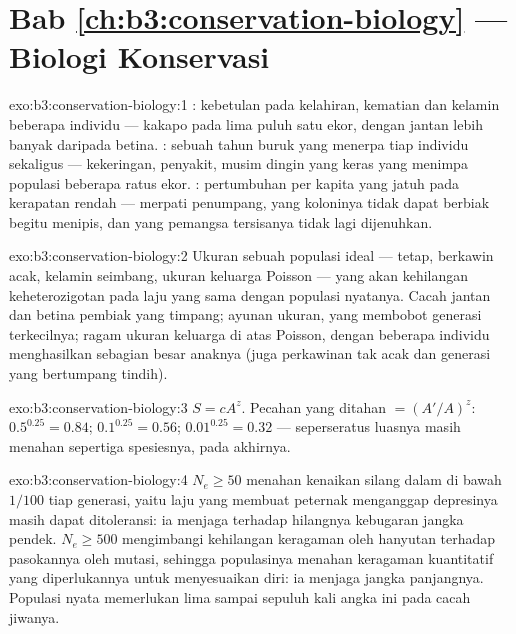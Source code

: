 \section*{Bab \ref{ch:b3:conservation-biology} --- Biologi Konservasi}

\begin{solution}{exo:b3:conservation-biology:1}
: kebetulan pada kelahiran, kematian dan kelamin
beberapa individu --- kakapo pada lima puluh satu ekor, dengan jantan
lebih banyak daripada betina. : sebuah tahun buruk
yang menerpa tiap individu sekaligus --- kekeringan, penyakit, musim
dingin yang keras yang menimpa populasi beberapa ratus ekor. :
pertumbuhan per kapita yang jatuh pada kerapatan rendah --- merpati
penumpang, yang koloninya tidak dapat berbiak begitu menipis, dan yang
pemangsa tersisanya tidak lagi dijenuhkan.
\end{solution}

\begin{solution}{exo:b3:conservation-biology:2}
Ukuran sebuah populasi ideal --- tetap, berkawin acak, kelamin seimbang,
ukuran keluarga Poisson --- yang akan kehilangan keheterozigotan pada laju
yang sama dengan populasi nyatanya. Cacah jantan dan betina pembiak yang
timpang; ayunan ukuran, yang membobot generasi terkecilnya; ragam ukuran
keluarga di atas Poisson, dengan beberapa individu menghasilkan sebagian
besar anaknya (juga perkawinan tak acak dan generasi yang bertumpang
tindih).
\end{solution}

\begin{solution}{exo:b3:conservation-biology:3}
$S = cA^{z}$. Pecahan yang ditahan $= (A'/A)^{z}$: $0.5^{0.25} = 0.84$;
$0.1^{0.25} = 0.56$; $0.01^{0.25} = 0.32$ --- seperseratus luasnya masih
menahan sepertiga spesiesnya, pada akhirnya.
\end{solution}

\begin{solution}{exo:b3:conservation-biology:4}
$N_{e} \ge 50$ menahan kenaikan silang dalam di bawah $1/100$ tiap
generasi, yaitu laju yang membuat peternak menganggap depresinya masih
dapat ditoleransi: ia menjaga terhadap hilangnya kebugaran jangka pendek. $N_{e} \ge
500$ mengimbangi kehilangan keragaman oleh hanyutan terhadap pasokannya
oleh mutasi, sehingga populasinya menahan keragaman kuantitatif yang
diperlukannya untuk menyesuaikan diri: ia menjaga jangka panjangnya.
Populasi nyata memerlukan lima sampai sepuluh kali angka ini pada cacah jiwanya.
\end{solution}

